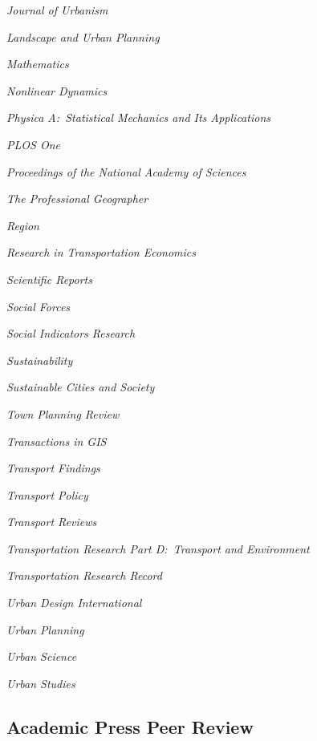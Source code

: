 \documentclass[11pt,letterpaper]{report}
\newcommand{\listitemspace}{0.25em}
\renewenvironment{itemize}
{\begin{list}{}{\setlength{\leftmargin}{0em}
                \setlength{\parskip}{0em}
                \setlength{\itemsep}{\listitemspace}
                \setlength{\parsep}{\listitemspace}}}
{\end{list}}
\begin{document}
\begin{itemize}
        \item \textit{Journal of Urbanism}
        \item \textit{Landscape and Urban Planning}
        \item \textit{Mathematics}
        \item \textit{Nonlinear Dynamics}
        \item \textit{Physica A:\ Statistical Mechanics and Its Applications}
        \item \textit{PLOS One}
        \item \textit{Proceedings of the National Academy of Sciences}
        \item \textit{The Professional Geographer}
        \item \textit{Region}
        \item \textit{Research in Transportation Economics}
        \item \textit{Scientific Reports}
        \item \textit{Social Forces}
        \item \textit{Social Indicators Research}
        \item \textit{Sustainability}
        \item \textit{Sustainable Cities and Society}
        \item \textit{Town Planning Review}
        \item \textit{Transactions in GIS}
        \item \textit{Transport Findings}
        \item \textit{Transport Policy}
        \item \textit{Transport Reviews}
        \item \textit{Transportation Research Part D:\ Transport and Environment}
        \item \textit{Transportation Research Record}
        \item \textit{Urban Design International}
        \item \textit{Urban Planning}
        \item \textit{Urban Science}
        \item \textit{Urban Studies}

    \end{itemize}

    \subsection*{Academic Press Peer Review}
\end{document}
